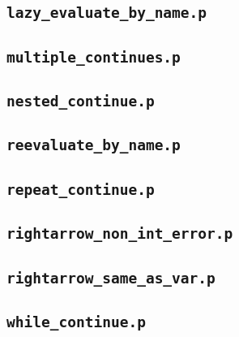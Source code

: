 \documentclass[a4paper,10pt]{article}
\begin{document}
\begin{multicols}{2}
\subsection{\textbf{\texttt{lazy\_evaluate\_by\_name.p}}}


\subsection{\textbf{\texttt{multiple\_continues.p}}}


\subsection{\textbf{\texttt{nested\_continue.p}}}


\subsection{\textbf{\texttt{reevaluate\_by\_name.p}}}


\subsection{\textbf{\texttt{repeat\_continue.p}}}


\subsection{\textbf{\texttt{rightarrow\_non\_int\_error.p}}}


\subsection{\textbf{\texttt{rightarrow\_same\_as\_var.p}}}


\subsection{\textbf{\texttt{while\_continue.p}}}


\end{multicols}
\end{document}

